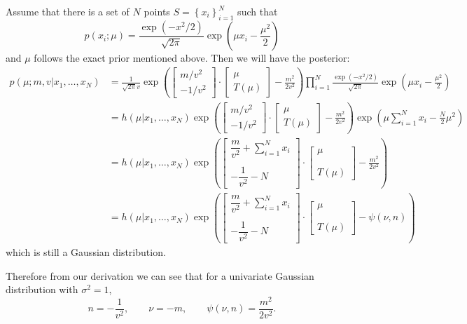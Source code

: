 \documentclass[letterpaper, 12pt]{article}
\begin{document}
Assume that there is a set of $N$ points $S=\left\{x_i \right\}_{i=1}^N$ such that $$p(x_i;\mu)=\frac{\exp(-x^2/2)}{\sqrt{2\pi}}\exp\left( \mu x_i-\frac{\mu^2}{2} \right)$$ and $\mu$ follows the exact prior mentioned above. Then we will have the posterior:
\begin{align*}
    p(\mu;m,v|x_1,\ldots,x_N)&=\frac{1}{\sqrt{2\pi}v}\exp\left( \begin{bmatrix}
        m/v^2\\-1/v^2
    \end{bmatrix}\cdot\begin{bmatrix}
        \mu\\T(\mu)
    \end{bmatrix}-\frac{m^2}{2v^2} \right)\prod_{i=1}^N\frac{\exp(-x^2/2)}{\sqrt{2\pi}}\exp\left( \mu x_i-\frac{\mu^2}{2} \right)\\
    &=h(\mu|x_1,\ldots,x_N)\exp\left( \begin{bmatrix}
        m/v^2\\-1/v^2
    \end{bmatrix}\cdot\begin{bmatrix}
        \mu\\T(\mu)
    \end{bmatrix}-\frac{m^2}{2v^2} \right)\exp\left( \mu\sum_{i=1}^Nx_i-\frac{N}{2}\mu^2 \right)\\
    &=h(\mu|x_1,\ldots,x_N)\exp\left( \begin{bmatrix}
        \dfrac{m}{v^2}+\sum_{i=1}^Nx_i\\~\\-\dfrac{1}{v^2}-N
    \end{bmatrix}\cdot\begin{bmatrix}
        \mu\\~\\~\\T(\mu)
    \end{bmatrix}-\frac{m^2}{2v^2} \right)\\&=h(\mu|x_1,\ldots,x_N)\exp\left( \begin{bmatrix}
        \dfrac{m}{v^2}+\sum_{i=1}^Nx_i\\~\\-\dfrac{1}{v^2}-N
    \end{bmatrix}\cdot\begin{bmatrix}
        \mu\\~\\~\\T(\mu)
    \end{bmatrix}-\psi(\nu,n) \right)
\end{align*}
which is still a Gaussian distribution.

Therefore from our derivation we can see that for a univariate Gaussian distribution with $\sigma^2=1$, $$n=-\frac{1}{v^2},\qquad \nu=-m,\qquad\psi(\nu,n)=\frac{m^2}{2v^2}.$$
\end{document}
